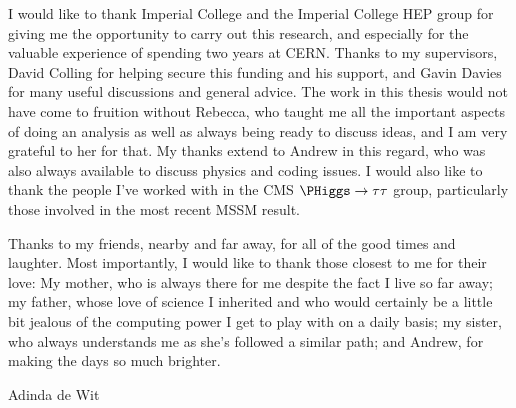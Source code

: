 \begin{acknowledgements}
I would like to thank Imperial College and the Imperial College HEP group 
for giving me the opportunity to carry out this research, and especially
for the valuable experience of spending two years at CERN. Thanks
to my supervisors, David Colling for helping secure this funding and his support, and Gavin Davies
for many useful discussions and general advice.
The work in this thesis would not have come to fruition without Rebecca, who taught me 
all the important aspects of doing an analysis as well as always being
ready to discuss ideas, and I am very grateful to her for that. My thanks extend
to Andrew in this regard, who was also always available to discuss physics and coding issues.
I would also like to thank the people I've worked with in the CMS $\PHiggs\rightarrow\tau\tau$ group,
particularly those involved in the most recent MSSM result. 

Thanks to my friends, nearby and far away, for all of the good times and laughter.
Most importantly, I would like to thank those closest to me for their love: My mother, who is always there
for me despite the fact I live so far away; my father, whose love of science I inherited and who
would certainly be a little bit jealous of the computing power I get to play with on a daily basis; my sister, 
who always understands me as she's followed a similar path; and Andrew, for making the days so much brighter.

\begin{flushright}
Adinda de Wit
\end{flushright}
\end{acknowledgements}


\tableofcontents
\listoffigures
\listoftables




